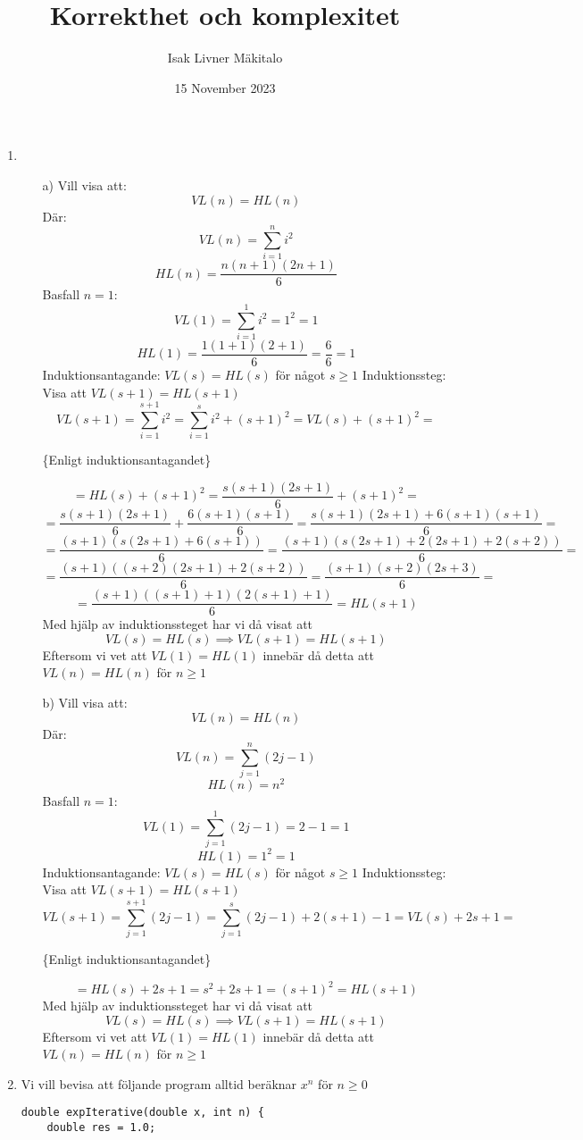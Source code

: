 \documentclass{article}
\title{Korrekthet och komplexitet}
\author{Isak Livner Mäkitalo}
\date{15 November 2023}
\begin{document}
\maketitle

\begin{enumerate}
  \item
  \begin{itemize}
      \item [a)]
      Vill visa att:
      \[VL(n)=HL(n)\]
      Där:
      \[VL(n)=\sum_{i=1}^{n}i^2\]
      \[HL(n)=\frac{n(n+1)(2n+1)}{6}\]
      Basfall \(n=1\):
      \[VL(1)=\sum_{i=1}^{1}i^2=1^2=1\]
      \[HL(1)=\frac{1(1+1)(2+1)}{6}=\frac{6}{6}=1\]
      Induktionsantagande: \(VL(s)=HL(s)\) för något \(s\geq1\) \newline
      Induktionssteg: Visa att \(VL(s+1)=HL(s+1)\) \newline
      \[VL(s+1)=\sum_{i=1}^{s+1}i^2=\sum_{i=1}^{s}i^2+(s+1)^2=VL(s)+(s+1)^2=\]
      \centerline{\{Enligt induktionsantagandet\}}
      \[=HL(s)+(s+1)^2=\frac{s(s+1)(2s+1)}{6}+(s+1)^2=\]
      \[=\frac{s(s+1)(2s+1)}{6}+\frac{6(s+1)(s+1)}{6}=\frac{s(s+1)(2s+1)+6(s+1)(s+1)}{6}=\]
      \[=\frac{(s+1)(s(2s+1)+6(s+1))}{6}=\frac{(s+1)(s(2s+1)+2(2s+1)+2(s+2))}{6}=\]
      \[=\frac{(s+1)((s+2)(2s+1)+2(s+2))}{6}=\frac{(s+1)(s+2)(2s+3)}{6}=\]
      \[=\frac{(s+1)((s+1)+1)(2(s+1)+1)}{6}=HL(s+1)\]
      Med hjälp av induktionssteget har vi då visat att
      \[VL(s)=HL(s) \implies VL(s+1)=HL(s+1)\]
      Eftersom vi vet att \(VL(1)=HL(1)\) innebär då detta att \(VL(n)=HL(n)\) för \(n \geq 1\)
      \vspace*{\baselineskip}
      \item [b)]
      Vill visa att:
      \[VL(n)=HL(n)\]
      Där:
      \[VL(n)=\sum_{j=1}^{n}(2j-1)\]
      \[HL(n)=n^2\]
      Basfall \(n=1\):
      \[VL(1)=\sum_{j=1}^{1}(2j-1)=2-1=1\]
      \[HL(1)=1^2=1\]
      Induktionsantagande: \(VL(s)=HL(s)\) för något \(s\geq1\) \newline
      Induktionssteg: Visa att \(VL(s+1)=HL(s+1)\) \newline
      \[VL(s+1)=\sum_{j=1}^{s+1}(2j-1)=\sum_{j=1}^{s}(2j-1)+2(s+1)-1=VL(s)+2s+1=\]
      \centerline{\{Enligt induktionsantagandet\}}
      \[=HL(s)+2s+1=s^2+2s+1=(s+1)^2=HL(s+1)\]
      Med hjälp av induktionssteget har vi då visat att
      \[VL(s)=HL(s) \implies VL(s+1)=HL(s+1)\]
      Eftersom vi vet att \(VL(1)=HL(1)\) innebär då detta att \(VL(n)=HL(n)\) för \(n \geq 1\)
  \end{itemize}
  \vspace*{\baselineskip}
  \item
  Vi vill bevisa att följande program alltid beräknar \(x^n\) för \(n \geq 0\)
  \begin{lstlisting}
double expIterative(double x, int n) {
    double res = 1.0;


\end{lstlisting}
\end{enumerate}
\end{document}
